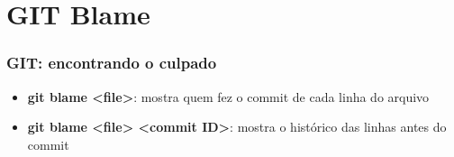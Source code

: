 \section{GIT Blame}
\begin{frame}
\frametitle{GIT: encontrando o culpado}

\begin{itemize}
\item \textbf{git blame <file>}: mostra quem fez o commit de cada linha do arquivo
\item \textbf{git blame <file> <commit ID>}: mostra o histórico das linhas antes do commit
\end{itemize}
\end{frame}


